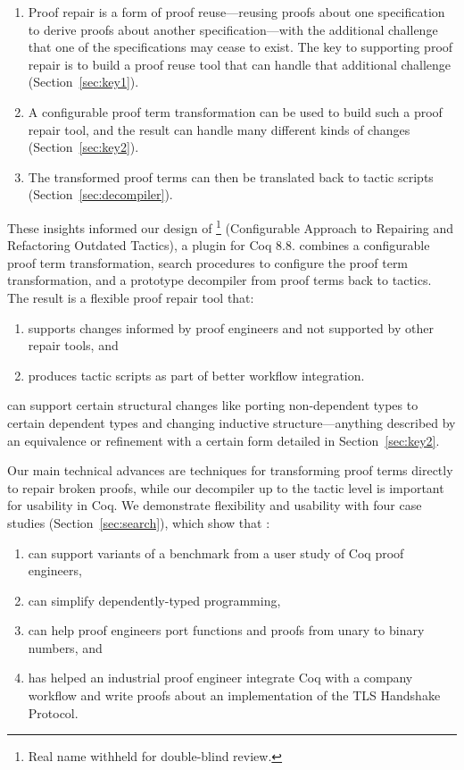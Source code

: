 \begin{enumerate}
\item Proof repair is a form of proof reuse---reusing proofs about one specification to derive proofs about another specification---with 
the additional challenge that one of the specifications may cease to exist.
The key to supporting proof repair is to build a proof reuse
tool that can handle that additional challenge (Section~\ref{sec:key1}). 
\item A configurable proof term transformation can be used to build such a proof repair tool,
and the result can handle many different kinds of changes (Section~\ref{sec:key2}).
\item The transformed proof terms can then be translated back to tactic scripts (Section~\ref{sec:decompiler}).
\end{enumerate}

These insights informed our design of 
\toolname\footnote{Real name withheld for double-blind review.} (Configurable Approach to Repairing and Refactoring Outdated Tactics), a plugin for Coq 8.8.
\toolname combines a configurable proof term transformation,
search procedures to configure the proof term transformation,
and a prototype decompiler from proof terms back to tactics.
The result is a flexible proof repair tool that: 

\begin{enumerate}
\item supports changes informed by proof engineers and not supported by other repair tools, and
\item produces tactic scripts as part of better workflow integration.
\end{enumerate}
\toolname can support certain structural changes like porting non-dependent types to certain dependent types
and changing inductive structure---anything described by an equivalence or refinement with a certain form
detailed in Section~\ref{sec:key2}.

Our main technical advances are techniques for transforming proof terms directly to repair broken proofs, 
while our decompiler up to the tactic level is important for usability in Coq.
We demonstrate flexibility and usability with four case studies (Section~\ref{sec:search}), which show that \toolname:

\begin{enumerate}
\item can support variants of a benchmark from a user study of Coq proof engineers,
\item can simplify dependently-typed programming, %
\item can help proof engineers port functions and proofs from unary to binary numbers, and
\item has helped an industrial proof engineer integrate Coq with a company workflow and write proofs about an implementation of the TLS Handshake Protocol.
\end{enumerate}

